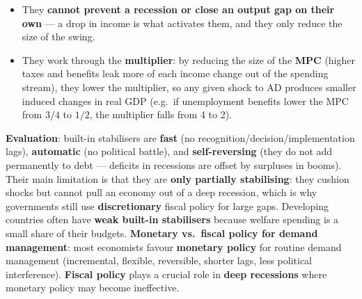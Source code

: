 \documentclass[a4paper,12pt]{article}
\begin{document}
\begin{itemize}
\begin{itemize}
    \item They \textbf{cannot prevent a recession or close an output gap on their own} --- a drop in income is what activates them, and they only reduce the size of the swing.
    \item They work through the \textbf{multiplier}: by reducing the size of the \textbf{MPC} (higher taxes and benefits leak more of each income change out of the spending stream), they lower the multiplier, so any given shock to AD produces smaller induced changes in real GDP (e.g.\ if unemployment benefits lower the MPC from $3/4$ to $1/2$, the multiplier falls from 4 to 2).
  \end{itemize}
\end{itemize}
\begin{center}
\end{center}
\textbf{Evaluation}: built-in stabilisers are \textbf{fast} (no recognition/decision/implementation lags), \textbf{automatic} (no political battle), and \textbf{self-reversing} (they do not add permanently to debt --- deficits in recessions are offset by surpluses in booms). Their main limitation is that they are \textbf{only partially stabilising}: they cushion shocks but cannot pull an economy out of a deep recession, which is why governments still use \textbf{discretionary} fiscal policy for large gaps. Developing countries often have \textbf{weak built-in stabilisers} because welfare spending is a small share of their budgets.
\textbf{Monetary vs.\ fiscal policy for demand management}: most economists favour \textbf{monetary policy} for routine demand management (incremental, flexible, reversible, shorter lags, less political interference). \textbf{Fiscal policy} plays a crucial role in \textbf{deep recessions} where monetary policy may become ineffective.
\end{document}
